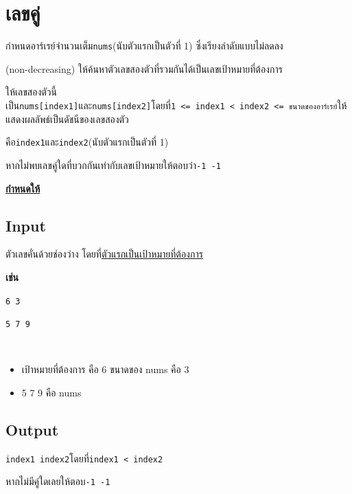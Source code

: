 \documentclass{article}
\begin{document}
\section*{เลขคู่}

กำหนดอาร์เรย์จำนวนเต็ม\texttt{nums}(นับตัวแรกเป็นตัวที่ 1) ซึ่งเรียงลำดับแบบไม่ลดลง

(non-decreasing) ให้ค้นหาตัวเลขสองตัวที่รวมกันได้เป็นเลขเป้าหมายที่ต้องการ

ให้เลขสองตัวนี้เป็น\texttt{nums{[}index1{]}}และ\texttt{nums{[}index2{]}}โดยที่\texttt{1\ \textless{}=\ index1\ \textless{}\ index2\ \textless{}=\ ขนาดของอาร์เรย์}ให้แสดงผลลัพธ์เป็นดัชนีของเลขสองตัว

คือ\texttt{index1}และ\texttt{index2}(นับตัวแรกเป็นตัวที่ 1)

หากไม่พบเลขคู่ใดที่บวกกันเท่ากับเลขเป้าหมายให้ตอบว่า\texttt{-1\ -1}



\textbf{\ul{กำหนดให้}}






\subsection*{Input}
ตัวเลขคั่นด้วยช่องว่าง โดยที่\ul{ตัวแรกเป็นเป้าหมายที่ต้องการ}



\textbf{เช่น}



\texttt{6\ 3}



\texttt{5\ 7\ 9}\strut \\



\begin{itemize}

\tightlist

\item

  เป้าหมายที่ต้องการ คือ 6 ขนาดของ nums คือ 3

\item

  5 7 9 คือ nums

\end{itemize}



\subsection*{Output}
\texttt{index1\ index2}โดยที่{\texttt{index1\ \textless{}\ index2}}



{หากไม่มีคู่ใดเลยให้ตอบ\texttt{-1\ -1}}
\end{document}
